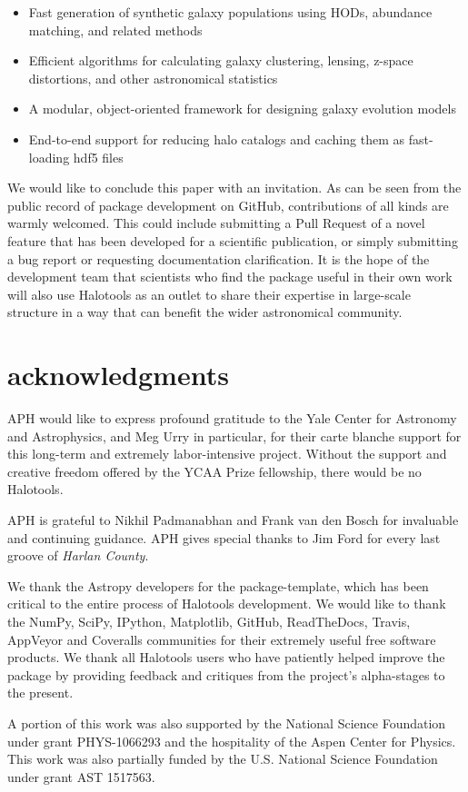 \documentclass[twocolumn, tighten]{aastex6}
\newcommand{\bit}{\begin{itemize}}
\newcommand{\eit}{\end{itemize}}
\begin{document}
\bit
\item Fast generation of synthetic galaxy populations using HODs, abundance matching, and related methods
\item Efficient algorithms for calculating galaxy clustering, lensing, z-space distortions, and other astronomical statistics
\item A modular, object-oriented framework for designing galaxy evolution models
\item End-to-end support for reducing halo catalogs and caching them as fast-loading hdf5 files
\eit

We would like to conclude this paper with an invitation. As can be seen from the public record of package development on GitHub, contributions of all kinds are warmly welcomed. This could include submitting a Pull Request of a novel feature that has been developed for a scientific publication, or simply submitting a bug report or requesting documentation clarification. It is the hope of the development team that scientists who find the package useful in their own work will also use Halotools as an outlet to share their expertise in large-scale structure in a way that can benefit the wider astronomical community. 


\section{acknowledgments}

APH would like to express profound gratitude to the Yale Center for Astronomy and Astrophysics, and Meg Urry in particular, for their carte blanche support for this long-term and extremely labor-intensive project. Without the support and creative freedom offered by the YCAA Prize fellowship, there would be no Halotools. 

APH is grateful to Nikhil Padmanabhan and Frank van den Bosch for invaluable and continuing guidance. APH gives special thanks to Jim Ford for every last groove of {\em Harlan County}. 

We thank the Astropy developers for the package-template, which has been critical to the entire process of Halotools development. 
We would like to thank the NumPy, SciPy, IPython, Matplotlib, GitHub, ReadTheDocs, Travis, AppVeyor and Coveralls communities for their extremely useful free software products. We thank all Halotools users who have patiently helped improve the package by providing feedback and critiques from the project's alpha-stages to the present. 

A portion of this work was also supported by the National Science Foundation under grant PHYS-1066293 and the hospitality of the Aspen Center for Physics. This work was also partially funded by the U.S. National Science Foundation under grant AST 1517563. 












\end{document}

